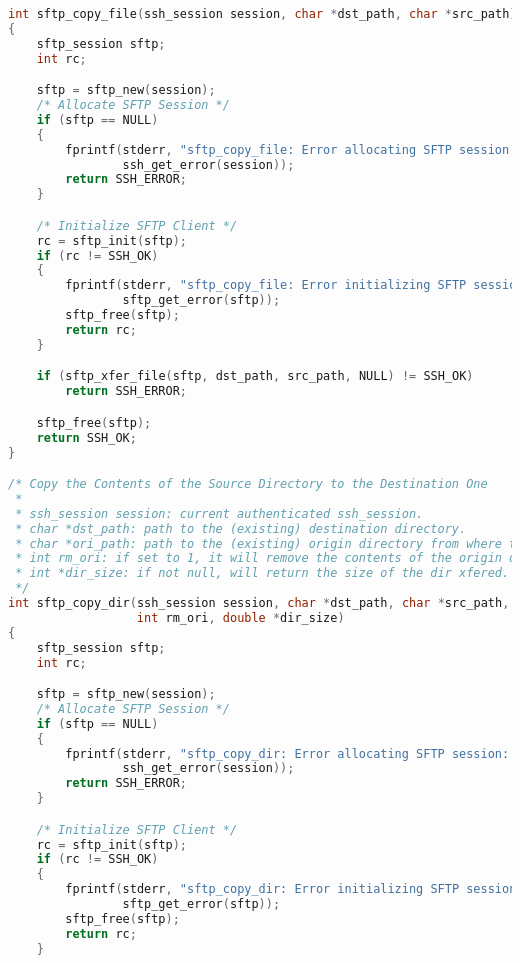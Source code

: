 \begin{lstlisting}[language=C,caption={Signature and schematic implementation of remote execution methods.\label{code:libssh}}]
int sftp_copy_file(ssh_session session, char *dst_path, char *src_path)
{
    sftp_session sftp;
    int rc;

    sftp = sftp_new(session);
    /* Allocate SFTP Session */
    if (sftp == NULL)
    {
        fprintf(stderr, "sftp_copy_file: Error allocating SFTP session: %s\n",
                ssh_get_error(session));
        return SSH_ERROR;
    }

    /* Initialize SFTP Client */
    rc = sftp_init(sftp);
    if (rc != SSH_OK)
    {
        fprintf(stderr, "sftp_copy_file: Error initializing SFTP session: %d\n",
                sftp_get_error(sftp));
        sftp_free(sftp);
        return rc;
    }

    if (sftp_xfer_file(sftp, dst_path, src_path, NULL) != SSH_OK)
        return SSH_ERROR;

    sftp_free(sftp);
    return SSH_OK;
}

/* Copy the Contents of the Source Directory to the Destination One 
 *
 * ssh_session session: current authenticated ssh_session.
 * char *dst_path: path to the (existing) destination directory.
 * char *ori_path: path to the (existing) origin directory from where to copy.
 * int rm_ori: if set to 1, it will remove the contents of the origin directory.
 * int *dir_size: if not null, will return the size of the dir xfered.
 */
int sftp_copy_dir(ssh_session session, char *dst_path, char *src_path,
                  int rm_ori, double *dir_size)
{
    sftp_session sftp;
    int rc;

    sftp = sftp_new(session);
    /* Allocate SFTP Session */
    if (sftp == NULL)
    {
        fprintf(stderr, "sftp_copy_dir: Error allocating SFTP session: %s\n",
                ssh_get_error(session));
        return SSH_ERROR;
    }

    /* Initialize SFTP Client */
    rc = sftp_init(sftp);
    if (rc != SSH_OK)
    {
        fprintf(stderr, "sftp_copy_dir: Error initializing SFTP session: %d\n",
                sftp_get_error(sftp));
        sftp_free(sftp);
        return rc;
    }


\end{lstlisting}
